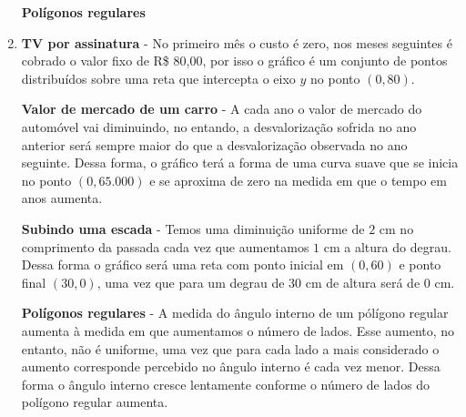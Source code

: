 \documentclass[10 pt,usenames,dvipsnames, oneside]{article}
\begin{document}
\begin{solucao}
\begin{enumerate}
\begin{center}
\end{center}

\textbf{Polígonos regulares}

\begin{center}
\end{center}

\item \textbf{TV por assinatura} - No primeiro mês o custo é zero, nos meses seguintes é cobrado o valor fixo de R\$ 80,00, por isso o gráfico é um conjunto de pontos distribuídos sobre uma reta que intercepta o eixo $y$ no ponto $(0,80)$.

\textbf{Valor de mercado de um carro} - A cada ano o valor de mercado do automóvel vai diminuindo, no entando, a desvalorização sofrida no ano anterior será sempre maior do que a desvalorização observada no ano seguinte. Dessa forma, o gráfico terá a forma de uma curva suave que se inicia no ponto $(0,65.000) $ e se aproxima de zero na medida em que o tempo em anos aumenta.

\textbf{Subindo uma escada} - Temos uma diminuição uniforme de $2$ cm no comprimento da passada cada vez que aumentamos $1$ cm a altura do degrau. Dessa forma o gráfico será uma reta com ponto inicial em $(0,60)$ e ponto final $(30,0)$, uma vez que para um degrau de $30$ cm de altura será de $0$ cm.

\textbf{Polígonos regulares} - A medida do ângulo interno de um pólígono regular aumenta à medida em que aumentamos o número de lados. Esse aumento, no entanto, não é uniforme, uma vez que para cada lado a mais considerado o aumento corresponde percebido no ângulo interno é cada vez menor. Dessa forma o ângulo interno cresce lentamente conforme o número de lados do polígono regular aumenta.


\end{enumerate}
\end{solucao}
\end{document}
